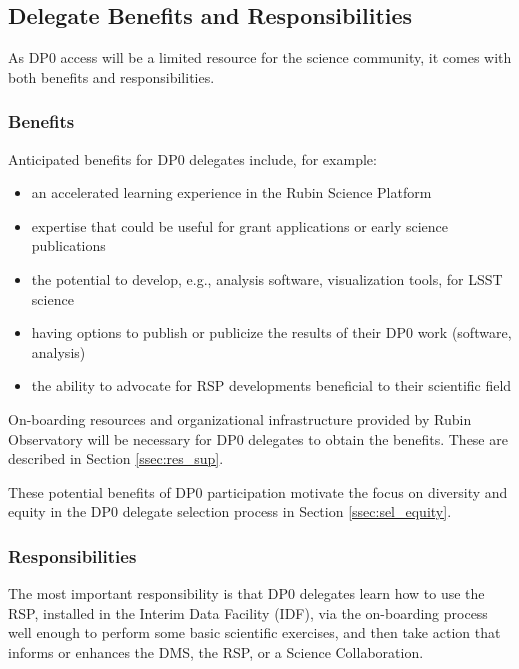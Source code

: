 \documentclass[DM,lsstdraft,authoryear,toc]{lsstdoc}
\begin{document}
\subsection{Delegate Benefits and Responsibilities}\label{ssec:intro_del}

As DP0 access will be a limited resource for the science community, it comes with both benefits and responsibilities.

\subsubsection{Benefits}\label{sssec:intro_del_bene}

Anticipated benefits for DP0 delegates include, for example:
\begin{itemize}
\item an accelerated learning experience in the Rubin Science Platform
\item expertise that could be useful for grant applications or early science publications
\item the potential to develop, e.g., analysis software, visualization tools, for LSST science 
\item having options to publish or publicize the results of their DP0 work (software, analysis)
\item the ability to advocate for RSP developments beneficial to their scientific field
\end{itemize}

On-boarding resources and organizational infrastructure provided by Rubin Observatory will be necessary for DP0 delegates to obtain the benefits. These are described in Section \ref{ssec:res_sup}.

These potential benefits of DP0 participation motivate the focus on diversity and equity in the DP0 delegate selection process in Section \ref{ssec:sel_equity}.

\subsubsection{Responsibilities}\label{sssec:intro_del_resp}

The most important responsibility is that DP0 delegates learn how to use the RSP,  installed in the Interim Data Facility (IDF), via the on-boarding process well enough to perform some basic scientific exercises, and then take action that informs or enhances the DMS, the RSP, or a Science Collaboration. 
\end{document}
